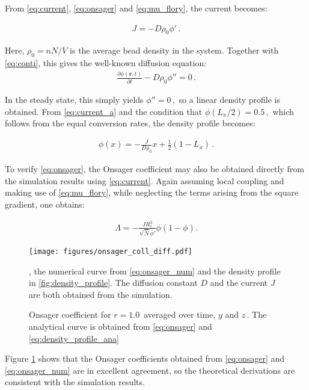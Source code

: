 \documentclass[bachelor,       %
               twoside,        %
               BCOR10mm,       %
                ngerman,english  %
               ]{GAUBM}
\begin{document}
From \eqref{eq:current}, \eqref{eq:onsager} and \eqref{eq:mu_flory}, the current becomes:


\begin{align}
  J=-D\rho_0\phi'\,.
  \label{eq:current_a}
\end{align}



Here, $\rho_0=nN/V$ is the average bead density in the system. Together with \eqref{eq:conti}, this gives the well-known diffusion equation:
\begin{align}
  \frac{\partial\phi(\mathbf r, t)}{\partial t}-D\rho_0  \phi''=0\,.
  \label{eq:diffusion}
\end{align}

In the steady state, this simply yields $\phi''=0\,,$ so a linear density profile is obtained. From \eqref{eq:current_a} and the condition that $\phi(L_x/2)=0.5\,,$ which follows from the equal conversion rates, the density profile becomes:

\begin{align}
  \phi(x)=-\frac{J}{D\rho_0}x + \frac{1}{2} (1-L_x)\,.
  \label{eq:density_profile_ana}
\end{align}

To verify \eqref{eq:onsager}, the Onsager coefficient may also be obtained directly from the simulation results using \eqref{eq:current}. Again assuming local coupling and making use of \eqref{eq:mu_flory}, while neglecting the terms arising from the square gradient, one obtains:

\begin{align}
  \Lambda=-\frac{JR_e^3}{\sqrt{\bar N}\phi'}\phi(1-\phi).
  \label{eq:onsager_num}
\end{align}

\begin{figure}[h]
  \centering
  \texttt{[image: figures/onsager\_coll\_diff.pdf]}
  \caption{Onsager coefficient for $r=1.0\,$ averaged over time, $y$ and $z\,$. The analytical curve is obtained from \eqref{eq:onsager} and \eqref{eq:density_profile_ana}}, the numerical curve from \eqref{eq:onsager_num} and the density profile in \ref{fig:density_profile}. The diffusion constant $D$ and the current $J$ are both obtained from the simulation.
  \label{fig:onsager_coeff}
\end{figure}

Figure \ref{fig:onsager_coeff} shows that the Onsager coefficients obtained from \eqref{eq:onsager} and \eqref{eq:onsager_num} are in excellent agreement, so the theoretical derivations are consistent with the simulation results.
\end{document}
